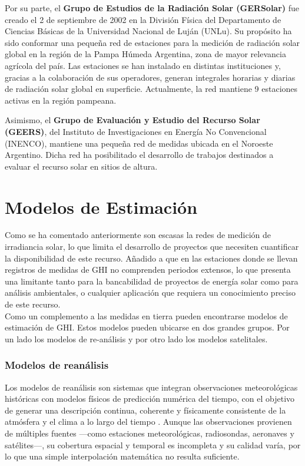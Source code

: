Por su parte, el \textbf{Grupo de Estudios de la Radiación Solar (GERSolar)} fue creado el 2 de septiembre de 2002 en la División Física del Departamento de Ciencias Básicas de la Universidad Nacional de Luján (UNLu). Su propósito ha sido conformar una pequeña red de estaciones para la medición de radiación solar global en la región de la Pampa Húmeda Argentina, zona de mayor relevancia agrícola del país. Las estaciones se han instalado en distintas instituciones y, gracias a la colaboración de sus operadores, generan integrales horarias y diarias de radiación solar global en superficie. Actualmente, la red mantiene 9 estaciones activas en la región pampeana.

Asimismo, el \textbf{Grupo de Evaluación y Estudio del Recurso Solar (GEERS)}, del Instituto de Investigaciones en Energía No Convencional (INENCO), mantiene una pequeña red de medidas ubicada en el Noroeste Argentino. Dicha red ha posibilitado el desarrollo de trabajos destinados a evaluar el recurso solar en sitios de altura.




\section{Modelos de Estimación} \label{ModelosDeEstimación}

Como se ha comentado anteriormente son escasas la redes de medición de irradiancia solar, lo que limita el desarrollo de proyectos que necesiten cuantificar la disponibilidad de este recurso. Añadido a que en las estaciones donde se llevan registros de medidas de GHI no comprenden periodos extensos, lo que presenta una limitante tanto para la bancabilidad de proyectos de energía solar como para análisis ambientales, o cualquier aplicación que requiera un conocimiento preciso de este recurso.\\

Como un complemento a las medidas en tierra pueden encontrarse modelos de estimación de GHI. Estos modelos pueden ubicarse en dos grandes grupos. Por un lado los modelos de re-análisis y por otro lado los modelos satelitales.


\subsubsection{Modelos de reanálisis}

Los modelos de reanálisis son sistemas que integran observaciones meteorológicas históricas con modelos físicos de predicción numérica del tiempo, con el objetivo de generar una descripción continua, coherente y físicamente consistente de la atmósfera y el clima a lo largo del tiempo \cite{Thejll2015}. Aunque las observaciones provienen de múltiples fuentes —como estaciones meteorológicas, radiosondas, aeronaves y satélites—, su cobertura espacial y temporal es incompleta y su calidad varía, por lo que una simple interpolación matemática no resulta suficiente.

